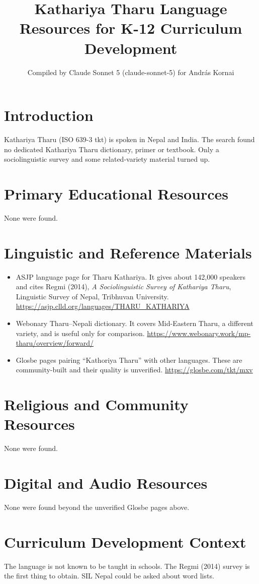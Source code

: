\documentclass[12pt]{article}
\title{Kathariya Tharu Language Resources for K-12 Curriculum Development}
\author{Compiled by Claude Sonnet 5 (claude-sonnet-5) for Andr\'as Kornai}
\date{}
\begin{document}
\maketitle

\section{Introduction}
Kathariya Tharu (ISO 639-3 tkt) is spoken in Nepal and India. The search found no dedicated Kathariya Tharu dictionary, primer or textbook. Only a sociolinguistic survey and some related-variety material turned up.

\section{Primary Educational Resources}
None were found.

\section{Linguistic and Reference Materials}
\begin{itemize}
\item ASJP language page for Tharu Kathariya. It gives about 142,000 speakers and cites Regmi (2014), \emph{A Sociolinguistic Survey of Kathariya Tharu}, Linguistic Survey of Nepal, Tribhuvan University. \url{https://asjp.clld.org/languages/THARU_KATHARIYA}
\item Webonary Tharu--Nepali dictionary. It covers Mid-Eastern Tharu, a different variety, and is useful only for comparison. \url{https://www.webonary.work/mp-tharu/overview/forward/}
\item Glosbe pages pairing ``Kathoriya Tharu'' with other languages. These are community-built and their quality is unverified. \url{https://glosbe.com/tkt/mxv}
\end{itemize}

\section{Religious and Community Resources}
None were found.

\section{Digital and Audio Resources}
None were found beyond the unverified Glosbe pages above.

\section{Curriculum Development Context}
The language is not known to be taught in schools. The Regmi (2014) survey is the first thing to obtain. SIL Nepal could be asked about word lists.
\end{document}
